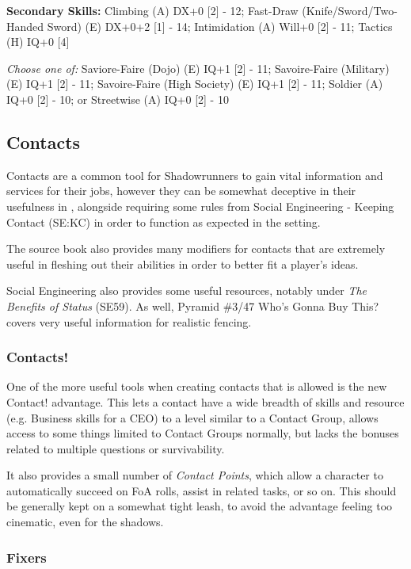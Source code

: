 \begin{multicols}{2}
	\textbf{Secondary Skills:}
	Climbing (A) DX+0 [2] - 12; Fast-Draw (Knife/Sword/Two-Handed Sword) (E) DX+0+2 [1] - 14; Intimidation (A) Will+0 [2] - 11; Tactics (H) IQ+0 [4]
	
	\textit{Choose one of:}
	Saviore-Faire (Dojo) (E) IQ+1 [2] - 11; Savoire-Faire (Military) (E) IQ+1 [2] - 11; Savoire-Faire (High Society) (E) IQ+1 [2] - 11; Soldier (A) IQ+0 [2] - 10; or Streetwise (A) IQ+0 [2] - 10
	
	\subsection{Contacts}\label{Contacts}
	
	Contacts are a common tool for Shadowrunners to gain vital information and services for their jobs, however they can be somewhat deceptive in their usefulness in \GURPS, alongside requiring some rules from \GURPS Social Engineering - Keeping Contact (SE:KC) in order to function as expected in the setting.
	
	The source book also provides many modifiers for contacts that are extremely useful in fleshing out their abilities in order to better fit a player's ideas.
	
	Social Engineering also provides some useful resources, notably under \textit{The Benefits of Status} (SE59). As well, Pyramid \#3/47 Who's Gonna Buy This? covers very useful information for realistic fencing.
	
	\subsubsection{Contacts!}
	
	One of the more useful tools when creating contacts that is allowed is the new Contact! advantage. This lets a contact have a wide breadth of skills and resource (e.g. Business skills for a CEO) to a level similar to a Contact Group, allows access to some things limited to Contact Groups normally, but lacks the bonuses related to multiple questions or survivability. 
	
	It also provides a small number of \textit{Contact Points}, which allow a character to automatically succeed on FoA rolls, assist in related tasks, or so on. This should be generally kept on a somewhat tight leash, to avoid the advantage feeling too cinematic, even for the shadows.
	
	\subsubsection{Fixers}
	

\end{multicols}
